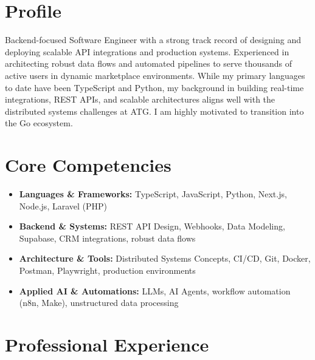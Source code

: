 \documentclass[11pt,a4paper,sans]{moderncv}
\begin{document}
\makecvtitle

\section{Profile}
Backend-focused Software Engineer with a strong track record of designing and deploying scalable API integrations and production systems. Experienced in architecting robust data flows and automated pipelines to serve thousands of active users in dynamic marketplace environments. While my primary languages to date have been TypeScript and Python, my background in building real-time integrations, REST APIs, and scalable architectures aligns well with the distributed systems challenges at ATG. I am highly motivated to transition into the Go ecosystem.

\section{Core Competencies}
\begin{itemize}
\item \textbf{Languages \& Frameworks:} TypeScript, JavaScript, Python, Next.js, Node.js, Laravel (PHP)
\item \textbf{Backend \& Systems:} REST API Design, Webhooks, Data Modeling, Supabase, CRM integrations, robust data flows
\item \textbf{Architecture \& Tools:} Distributed Systems Concepts, CI/CD, Git, Docker, Postman, Playwright, production environments
\item \textbf{Applied AI \& Automations:} LLMs, AI Agents, workflow automation (n8n, Make), unstructured data processing
\end{itemize}

\section{Professional Experience}

\end{document}
